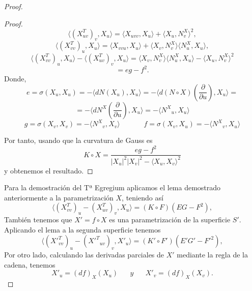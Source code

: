 \begin{proof}
\begin{proof}
		\[
			\langle (X^{T}_{uv})_v, X_u \rangle = \langle X_{uvv}, X_u \rangle + \langle X_u, N^{X}_v \rangle ^2,
		\]
		\[
			\langle (X^{T}_{vv})_u, X_u \rangle = \langle X_{vvu}, X_u \rangle + \langle X_v, N^{X}_{v} \rangle \langle N^{X}_{u}, X_u \rangle ,
		\]
	${ }$\\	
		\[
			\langle (X^{T}_{vv})_u, X_u \rangle - \langle (X^{T}_{uv})_v, X_u \rangle = \langle X_v, N^{X}_{v} \rangle \langle N^{X}_{u}, X_u \rangle - \langle X_u, N^{X}_{v} \rangle ^2
		\]
		\[
			= eg - f^2.
		\]
		${ }$\\
		
		Donde,
		${ }$\\
		\[
			e = \sigma(X_u, X_u) = - \langle dN(X_u), X_u \rangle = - \langle d(N\circ X)(\frac{\partial}{\partial u} ), X_u \rangle =
		\]
		\[
			= - \langle dN^X(\frac{\partial}{\partial u} ), X_u\rangle = - \langle {N^X}_u, X_u \rangle
		\]
	${ }$\\	
		\[
			g = \sigma (X_v, X_v) =  - \langle {N^X}_v, X_v \rangle \;\;\;\;\;\;\;\;\;\;\;\; f = \sigma (X_v, X_u) =  - \langle {N^X}_v, X_u \rangle
		\]
		
		Por tanto, usando que la curvatura de Gauss es
		${ }$\\
		\[
			K \circ X = \frac{eg - f^2}{|X_u|^2|X_v|^2 - \langle X_u, X_v\rangle ^2}
		\]
		${ }$\\
		y obtenemos el resultado.

	\end{proof}
	
	
	Para la demostración del Tª Egregium aplicamos el lema demostrado anteriormente a la parametrización $X$, teniendo así
	${ }$\\
	\[
		\langle (X^{T}_{vv})_u - (X^{T}_{uv})_{v}, X_u \rangle = (K \circ F)(EG - F^2),
	\]
	${ }$\\
	
	También tenemos que $X' = f \circ X$ es una parametrización de la superficie $S'$. Aplicando el lema a la segunda superficie tenemos
	${ }$\\
	\[
		\langle ({X'}^{T}_{vv})_u - ({X'^T}_{uv})_v, X'_u \rangle = (K' \circ F')(E'G' - F'^2),
	\]
	${ }$\\
	
	Por otro lado, calculando las derivadas parciales de $X'$ mediante la regla de la cadena, tenemos
	${ }$\\
	\[
		{X'}_{u} = (df)_X(X_u) \;\;\;\;\;\; y \;\;\;\;\;\; X'_v = (df)_X(X_v).
	\]
	${ }$\\
	

\end{proof}
